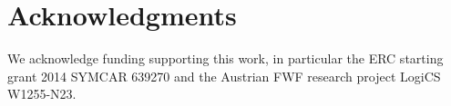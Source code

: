\documentclass[runningheads]{llncs}
\begin{document}




\section*{Acknowledgments}
We acknowledge funding supporting this work, in
particular the ERC starting grant 2014 SYMCAR 639270 and
the Austrian FWF
research project LogiCS W1255-N23. 







% 
\end{document}

